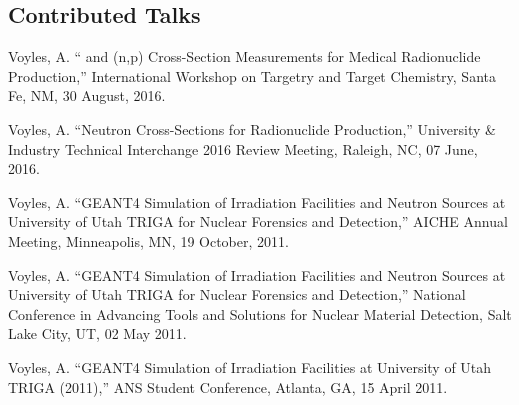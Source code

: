 \documentclass[margin,line]{res}
\begin{document}
\begin{resume}
% 
% 
% 
% 
% 

\section{\sc Contributed Talks}
Voyles, A. \enquote{  and  (n,p) Cross-Section Measurements for Medical Radionuclide Production,}  International Workshop on Targetry and Target Chemistry, Santa Fe, NM, 30 August, 2016.

Voyles, A. \enquote{Neutron Cross-Sections for Radionuclide Production,}  University \& Industry Technical Interchange 2016 Review Meeting, Raleigh, NC, 07 June, 2016.

Voyles, A. \enquote{GEANT4 Simulation of Irradiation Facilities and Neutron Sources at University of Utah TRIGA for
Nuclear Forensics and Detection,}  AICHE Annual Meeting, Minneapolis, MN, 19 October, 2011.

Voyles, A. \enquote{GEANT4 Simulation of Irradiation Facilities and Neutron Sources at University of Utah TRIGA for
Nuclear Forensics and Detection,}   National Conference in Advancing Tools and Solutions for
Nuclear Material Detection, Salt Lake City, UT, 02 May 2011.

Voyles, A. \enquote{GEANT4 Simulation of Irradiation Facilities at University of Utah TRIGA (2011),} 
ANS Student Conference, Atlanta, GA, 15 April 2011.



\end{resume}
\end{document}

